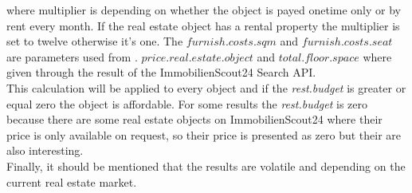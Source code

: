 where multiplier is depending on whether the object is payed onetime only or by rent every month. If the real estate
 object has a rental property the multiplier is set to twelve otherwise it's one. The $furnish.costs.sqm$ and
 $furnish.costs.seat$ are parameters used from \cite{BenchmarkGastronomie}. $price.real.estate.object$ and
 $total.floor.space$ where given through the result of the ImmobilienScout24 Search \ac{API}. \\
 This calculation will be applied to
 every object and if the \textit{rest.budget} is greater or equal zero the object is affordable. For some results the
 \textit{rest.budget} is zero because there are some real estate objects on ImmobilienScout24 where their
 price is only available on request, so their price is presented as zero but their are also interesting. \\

Finally, it should be mentioned that the results are volatile and depending on the current real estate market.
